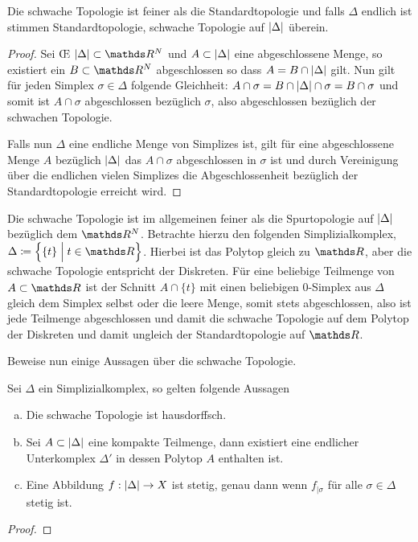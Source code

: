 \begin{Lem}
  Die schwache Topologie ist feiner als die Standardtopologie und
  falls $\Delta$ endlich ist stimmen Standardtopologie, schwache
  Topologie auf $\left| \Delta \right|$ überein.
  \begin{proof}
    Sei \OE\; $\gr{\Delta} \subset \R^N$ und $A \subset \left| \Delta \right|$
    eine abgeschlossene Menge, so existiert ein $B \subset \R^N$
    abgeschlossen so dass $A = B \cap \left| \Delta \right|$ gilt. Nun gilt für
    jeden Simplex $\sigma \in \Delta$ folgende Gleichheit:
    $A \cap \sigma = B \cap \left| \Delta \right| \cap \sigma = B \cap \sigma$
    und somit ist $A \cap \sigma$ abgeschlossen bezüglich $\sigma$,
    also abgeschlossen bezüglich der schwachen Topologie.
		
    Falls nun $\Delta$ eine endliche Menge von Simplizes ist, gilt für
    eine abgeschlossene Menge $A$ bezüglich $\left| \Delta \right|$ das
    $A \cap \sigma$ abgeschlossen in $\sigma$ ist und durch
    Vereinigung über die endlichen vielen Simplizes die
    Abgeschlossenheit bezüglich der Standardtopologie erreicht wird.
  \end{proof}
\end{Lem}

\begin{Bem}
  Die schwache Topologie ist im allgemeinen feiner als die
  Spurtopologie auf $\left| \Delta \right|$ bezüglich dem $\R^N$. Betrachte
  hierzu den folgenden Simplizialkomplex,
  $\Delta \coloneqq \set{ \{t\} }{t \in \R}$.  Hierbei ist das
  Polytop gleich zu $\R$, aber die schwache
  Topologie entspricht der Diskreten. Für eine beliebige
  Teilmenge von $A \subset \R$ ist der Schnitt $A \cap \{ t \}$ mit
  einen beliebigen $0$-Simplex aus $\Delta$ gleich dem Simplex selbst oder die leere Menge,
  somit stets abgeschlossen, also ist jede Teilmenge abgeschlossen und
  damit die schwache Topologie auf dem Polytop der Diskreten und
  damit ungleich der Standardtopologie auf $\R$.
\end{Bem}

Beweise nun einige Aussagen über die schwache Topologie.

\begin{Satz}
  Sei $\Delta$ ein Simplizialkomplex, so gelten folgende Aussagen
  \begin{enumerate}[(a)]
        \item Die schwache Topologie ist hausdorffsch.
        \item Sei $A \subset \left| \Delta \right|$ eine kompakte Teilmenge,
          dann existiert eine endlicher Unterkomplex $\Delta'$ in
          dessen Polytop $A$ enthalten ist.
        \item Eine Abbildung $f: \left| \Delta \right| \rightarrow X$ ist
          stetig, genau dann wenn $f_{| \sigma}$ für alle
          $\sigma \in \Delta$ stetig ist.
	\end{enumerate}
	\begin{proof}
	\end{proof}
\end{Satz}

